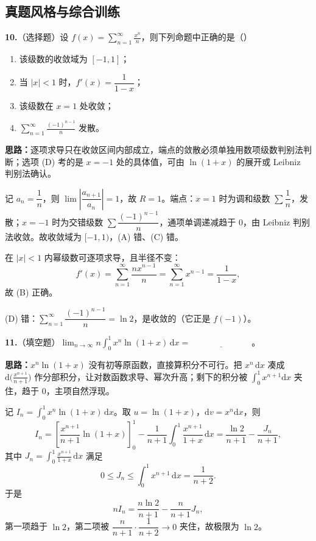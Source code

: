 \subsection{真题风格与综合训练}

\textbf{10.}（选择题）设 $\displaystyle f(x)=\sum_{n=1}^{\infty}\frac{x^{n}}{n}$，则下列命题中正确的是（\quad）

\begin{enumerate}[label=(\Alph*)]
\item 该级数的收敛域为 $[-1,1]$；
\item 当 $|x|<1$ 时，$f'(x)=\dfrac{1}{1-x}$；
\item 该级数在 $x=1$ 处收敛；
\item $\displaystyle\sum_{n=1}^{\infty}\frac{(-1)^{n-1}}{n}$ 发散。
\end{enumerate}

\ifshowsolutions%
\textbf{思路：}逐项求导只在收敛区间内部成立，端点的敛散必须单独用数项级数判别法判断；选项 (D) 考的是 $x=-1$ 处的具体值，可由 $\ln(1+x)$ 的展开或 Leibniz 判别法确认。

记 $a_{n}=\dfrac{1}{n}$，则 $\lim\left|\dfrac{a_{n+1}}{a_{n}}\right|=1$，故 $R=1$。端点：$x=1$ 时为调和级数 $\sum\dfrac1n$，发散；$x=-1$ 时为交错级数 $\sum\dfrac{(-1)^{n-1}}{n}$，通项单调递减趋于 $0$，由 Leibniz 判别法收敛。故收敛域为 $[-1,1)$，(A) 错、(C) 错。

在 $|x|<1$ 内幂级数可逐项求导，且半径不变：
\[
f'(x)=\sum_{n=1}^{\infty}\frac{n x^{n-1}}{n}=\sum_{n=1}^{\infty}x^{n-1}
=\frac{1}{1-x},
\]
故 (B) 正确。

(D) 错：$\sum\limits_{n=1}^{\infty}\dfrac{(-1)^{n-1}}{n}=\ln2$，是收敛的（它正是 $f(-1)$）。


\else \answerarea[8] \fi%
\textbf{11.}（填空题）$\displaystyle\lim_{n\to\infty}n\int_{0}^{1}x^{n}\ln(1+x)\,\mathrm{d}x=\underline{\hspace{3cm}}$。

\ifshowsolutions%
\textbf{思路：}$x^{n}\ln(1+x)$ 没有初等原函数，直接算积分不可行。把 $x^{n}\,\mathrm{d}x$ 凑成 $\mathrm{d}\bigl(\frac{x^{n+1}}{n+1}\bigr)$ 作分部积分，让对数函数求导、幂次升高；剩下的积分被 $\int_{0}^{1}x^{n+1}\mathrm{d}x$ 夹住，趋于 $0$，主项自然浮现。

记 $I_{n}=\displaystyle\int_{0}^{1}x^{n}\ln(1+x)\,\mathrm{d}x$。取 $u=\ln(1+x)$，$\mathrm{d}v=x^{n}\mathrm{d}x$，则
\[
I_{n}=\left[\frac{x^{n+1}}{n+1}\ln(1+x)\right]_{0}^{1}
-\frac{1}{n+1}\int_{0}^{1}\frac{x^{n+1}}{1+x}\,\mathrm{d}x
=\frac{\ln2}{n+1}-\frac{J_{n}}{n+1},
\]
其中 $J_{n}=\displaystyle\int_{0}^{1}\frac{x^{n+1}}{1+x}\,\mathrm{d}x$ 满足
\[
0\le J_{n}\le\int_{0}^{1}x^{n+1}\,\mathrm{d}x=\frac{1}{n+2}.
\]
于是
\[
nI_{n}=\frac{n\ln2}{n+1}-\frac{n}{n+1}J_{n},
\]
第一项趋于 $\ln2$，第二项被 $\dfrac{n}{n+1}\cdot\dfrac{1}{n+2}\to0$ 夹住，故极限为 $\ln2$。

